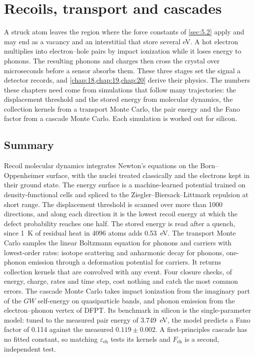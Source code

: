 \chapter{Recoils, transport and cascades}\label{chap:29}

A struck atom leaves the region where the force constants of \cref{sec:5.2} apply and may end as a vacancy and an interstitial that store several eV. A hot electron multiplies into electron--hole pairs by impact ionization while it loses energy to phonons. The resulting phonons and charges then cross the crystal over microseconds before a sensor absorbs them. These three stages set the signal a detector records, and \cref{chap:18,chap:19,chap:20} derive their physics. The numbers these chapters need come from simulations that follow many trajectories: the displacement threshold and the stored energy from molecular dynamics, the collection kernels from a transport Monte Carlo, the pair energy and the Fano factor from a cascade Monte Carlo. Each simulation is worked out for silicon.





\section*{Summary}

Recoil molecular dynamics integrates Newton's equations on the Born--Oppenheimer surface, with the nuclei treated classically and the electrons kept in their ground state. The energy surface is a machine-learned potential trained on density-functional cells and spliced to the Ziegler--Biersack--Littmark repulsion at short range. The displacement threshold is scanned over more than 1000 directions, and along each direction it is the lowest recoil energy at which the defect probability reaches one half. The stored energy is read after a quench, since \SI{1}{K} of residual heat in 4096 atoms adds \SI{0.53}{eV}. The transport Monte Carlo samples the linear Boltzmann equation for phonons and carriers with lowest-order rates: isotope scattering and anharmonic decay for phonons, one-phonon emission through a deformation potential for carriers. It returns collection kernels that are convolved with any event. Four closure checks, of energy, charge, rates and time step, cost nothing and catch the most common errors. The cascade Monte Carlo takes impact ionization from the imaginary part of the $GW$ self-energy on quasiparticle bands, and phonon emission from the electron--phonon vertex of DFPT. Its benchmark in silicon is the single-parameter model: tuned to the measured pair energy of \SI{3.749}{eV}, the model predicts a Fano factor of 0.114 against the measured $0.119 \pm 0.002$. A first-principles cascade has no fitted constant, so matching $\varepsilon_{\mathrm{eh}}$ tests its kernels and $F_{\mathrm{eh}}$ is a second, independent test.

\printbibliography[heading=subbibliography]
